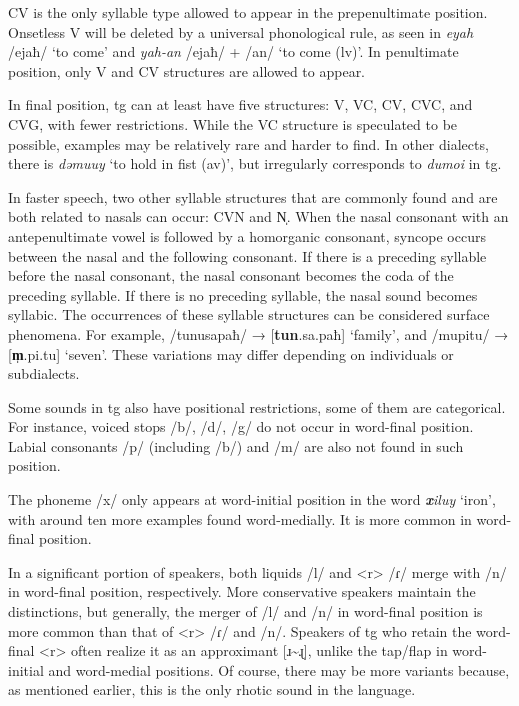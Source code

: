 CV is the only syllable type allowed to appear in the prepenultimate position. Onsetless V will be deleted by a universal phonological rule, as seen in \textit{eyah} /ejaħ/ `to come' and \textit{yah-an} /ejaħ/ + /an/ `to come (\acs{lv})'. In penultimate position, only V and CV structures are allowed to appear.

In final position, \acl{tg} can at least have five structures: V, VC, CV, CVC, and CVG, with fewer restrictions. While the VC structure is speculated to be possible, examples may be relatively rare and harder to find. In other dialects, there is \textit{dəmuuy} `to hold in fist (\acs{av})', but irregularly corresponds to \textit{dumoi} in \acl{tg}.

In faster speech, two other syllable structures that are commonly found and are both related to nasals can occur: CVN and N̩. When the nasal consonant with an antepenultimate vowel is followed by a homorganic consonant, syncope occurs between the nasal and the following consonant. If there is a preceding syllable before the nasal consonant, the nasal consonant becomes the coda of the preceding syllable. If there is no preceding syllable, the nasal sound becomes syllabic. The occurrences of these syllable structures can be considered surface phenomena. For example, /tunusapaħ/ → [\textbf{tun}.sa.paħ] `family', and /mupitu/ → [\textbf{m̩}.pi.tu] `seven'. These variations may differ depending on individuals or subdialects.

Some sounds in \acl{tg} also have positional restrictions, some of them are categorical. For instance, voiced stops /b/, /d/, /g/ do not occur in word-final position. Labial consonants /p/ (including /b/) and /m/ are also not found in such position. 

The phoneme /x/ only appears at word-initial position in the word \textit{\textbf{x}iluy} `iron', with around ten more examples found word-medially. It is more common in word-final position.

In a significant portion of speakers, both liquids /l/ and <r> /ɾ/ merge with /n/ in word-final position, respectively. More conservative speakers maintain the distinctions, but generally, the merger of /l/ and /n/ in word-final position is more common than that of <r> /ɾ/ and /n/. Speakers of \acl{tg} who retain the word-final <r> often realize it as an approximant [ɹ\~{}ɻ], unlike the tap/flap in word-initial and word-medial positions. Of course, there may be more variants because, as mentioned earlier, this is the only rhotic sound in the language.

